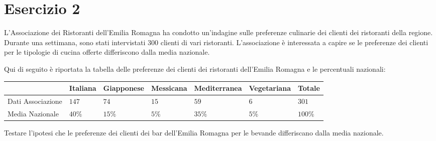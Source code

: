 \documentclass[
  11pt,
]{book}
\theoremstyle{mytheoremstyle}
\theoremstyle{mydefstyle}
\begin{document}
\section{Esercizio 2}\label{esercizio-2-2}

L'Associazione dei Ristoranti dell'Emilia Romagna ha condotto un'indagine sulle preferenze culinarie dei clienti dei ristoranti della regione. Durante una settimana, sono stati intervistati 300 clienti di vari ristoranti. L'associazione è interessata a capire se le preferenze dei clienti per le tipologie di cucina offerte differiscono dalla media nazionale.

Qui di seguito è riportata la tabella delle preferenze dei clienti dei ristoranti dell'Emilia Romagna e le percentuali nazionali:

\begin{table}[H]
\centering
\begin{tabular}{lllllll}
\toprule
  & Italiana & Giapponese & Messicana & Mediterranea & Vegetariana & Totale\\
\midrule
Dati Associazione & $147$ & $74$ & $15$ & $59$ & $6$ & $301$\\
Media Nazionale & $40\%$ & $15\%$ & $5\%$ & $35\%$ & $5\%$ & $100\%$\\
\bottomrule
\end{tabular}
\end{table}

Testare l'ipotesi che le preferenze dei clienti dei bar dell'Emilia Romagna per le bevande differiscano dalla media nazionale.
\end{document}
